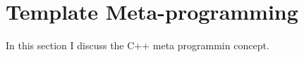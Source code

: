 \section{Template Meta-programming}
\label{sec:preliminaries:cpp}

In this section I discuss the C++ meta programmin concept.